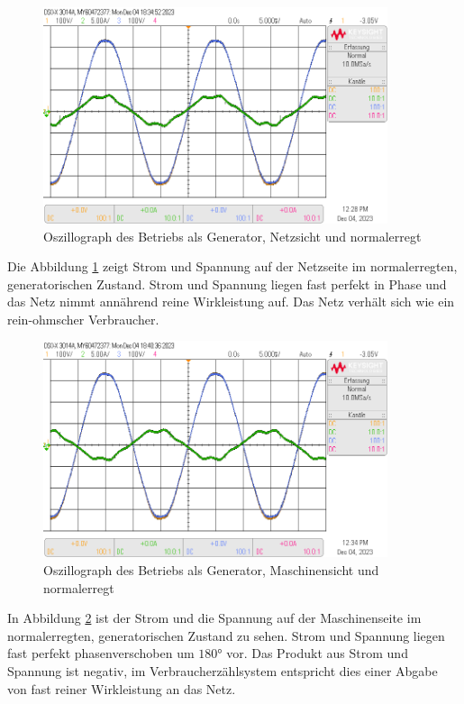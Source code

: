 \documentclass{report}
\begin{document}
\begin{figure}[!ht]
	\centering
	\includegraphics[width=0.9\textwidth]{./assets/img/synchronisation_netz_generator_ne_vzp.png}
	\caption{Oszillograph des Betriebs als Generator, Netzsicht und normalerregt}
	\label{fig:sngn}
\end{figure}

Die Abbildung \ref{fig:sngn} zeigt Strom und Spannung auf der Netzseite im normalerregten, generatorischen Zustand. Strom und Spannung liegen fast perfekt in Phase und das Netz nimmt annährend reine Wirkleistung auf. Das Netz verhält sich wie ein rein-ohmscher Verbraucher.

\begin{figure}[!ht]
	\centering
	\includegraphics[width=0.9\textwidth]{./assets/img/synchronisation_maschine_generator_ne_vzp.png}
	\caption{Oszillograph des Betriebs als Generator, Maschinensicht und normalerregt}
	\label{fig:smgn}
\end{figure}

In Abbildung \ref{fig:smgn} ist der Strom und die Spannung auf der Maschinenseite im normalerregten, generatorischen Zustand zu sehen. Strom und Spannung liegen fast perfekt phasenverschoben um $180°$ vor. Das Produkt aus Strom und Spannung ist negativ, im Verbraucherzählsystem entspricht dies einer Abgabe von fast reiner Wirkleistung an das Netz.
\end{document}
